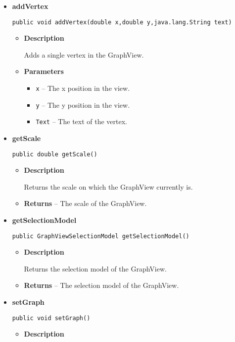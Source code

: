 {{{{{{{\begin{itemize}
{\begin{itemize}
{Adds a grid to the GraphView, on which the dragging can be mapped.
}
\end{itemize}
}%
\item{ 
{\bf  addVertex}\\
\begin{lstlisting}[frame=none]
public void addVertex(double x,double y,java.lang.String text)\end{lstlisting} %
\begin{itemize}
\item{
{\bf  Description}

Adds a single vertex in the GraphView.
}
\item{
{\bf  Parameters}
  \begin{itemize}
   \item{
\texttt{x} -- The x position in the view.}
   \item{
\texttt{y} -- The y position in the view.}
   \item{
\texttt{Text} -- The text of the vertex.}
  \end{itemize}
}%
\end{itemize}
}%
\item{ 
{\bf  getScale}\\
\begin{lstlisting}[frame=none]
public double getScale()\end{lstlisting} %
\begin{itemize}
\item{
{\bf  Description}

Returns the scale on which the GraphView currently is.
}
\item{{\bf  Returns} -- 
The scale of the GraphView. 
}%
\end{itemize}
}%
\item{ 
{\bf  getSelectionModel}\\
\begin{lstlisting}[frame=none]
public GraphViewSelectionModel getSelectionModel()\end{lstlisting} %
\begin{itemize}
\item{
{\bf  Description}

Returns the selection model of the GraphView.
}
\item{{\bf  Returns} -- 
The selection model of the GraphView. 
}%
\end{itemize}
}%
\item{ 
{\bf  setGraph}\\
\begin{lstlisting}[frame=none]
public void setGraph()\end{lstlisting} %
\begin{itemize}
\item{
{\bf  Description}

}
\end{itemize}}
\end{itemize}}}}}}}}
